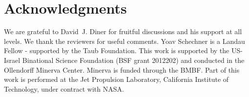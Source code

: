 \documentclass[10pt,letterpaper]{article}
\begin{document}

\section*{Acknowledgments}
\label{sec:acknowledgments}


We are grateful to David~J. Diner for fruitful discussions and his support at all levels. We thank the reviewers for useful comments. Yoav Schechner is a Landau Fellow - supported by the Taub Foundation. This work is supported by the US-Israel Binational Science Foundation (BSF grant 2012202) and conducted in the Ollendorff Minerva Center. Minerva is funded through the BMBF. Part of this work is performed at the Jet Propulsion
Laboratory, California Institute of Technology, under contract with NASA. 
\end{document}
